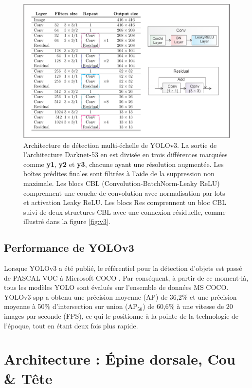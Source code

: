 \documentclass{article}
\begin{document}
\begin{figure}[htbp]
    \centering
    \includegraphics[scale=0.25]{Figures/v3.png}
    \caption{Architecture de détection multi-échelle de YOLOv3. La sortie de l'architecture Darknet-53 en est divisée en trois différentes marquées comme \textbf{y1}, \textbf{y2} et \textbf{y3}, chacune ayant une résolution augmentée. Les boîtes prédites finales sont filtrées à l'aide de la suppression non maximale. Les blocs CBL (Convolution-BatchNorm-Leaky ReLU) comprennent une couche de convolution avec normalisation par lots et activation Leaky ReLU. Les blocs Res comprennent un bloc CBL suivi de deux structures CBL avec une connexion résiduelle, comme illustré dans la figure \ref{fig:v3}.}
    \label{fig:multi}
\end{figure}


\subsection{Performance de YOLOv3}

Lorsque YOLOv3 a été publié, le référentiel pour la détection d'objets est passé de PASCAL VOC à Microsoft COCO \cite{37}. Par conséquent, à partir de ce moment-là, tous les modèles YOLO sont évalués sur l'ensemble de données MS COCO. YOLOv3-spp a obtenu une précision moyenne (AP) de 36,2\% et une précision moyenne à 50\% d'intersection sur union (AP$_{50}$) de 60,6\% à une vitesse de 20 images par seconde (FPS), ce qui le positionne à la pointe de la technologie de l'époque, tout en étant deux fois plus rapide.


\section{Architecture : Épine dorsale, Cou \& Tête}
\end{document}
